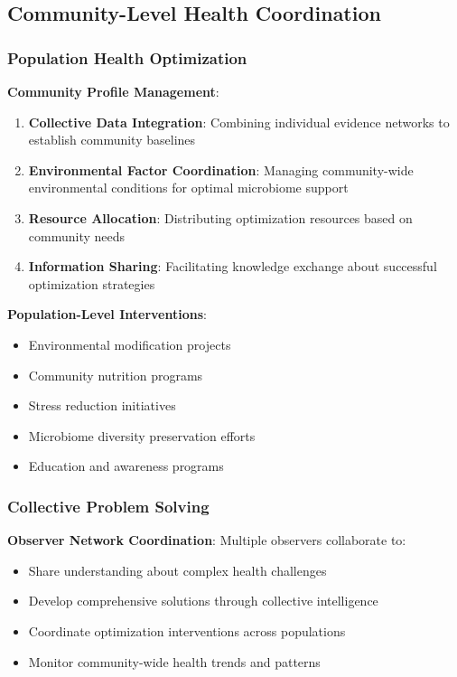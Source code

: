 \documentclass[12pt,a4paper]{article}
\begin{document}
\subsection{Community-Level Health Coordination}

\subsubsection{Population Health Optimization}

\textbf{Community Profile Management}:
\begin{enumerate}
\item \textbf{Collective Data Integration}: Combining individual evidence networks to establish community baselines
\item \textbf{Environmental Factor Coordination}: Managing community-wide environmental conditions for optimal microbiome support
\item \textbf{Resource Allocation}: Distributing optimization resources based on community needs
\item \textbf{Information Sharing}: Facilitating knowledge exchange about successful optimization strategies
\end{enumerate}

\textbf{Population-Level Interventions}:
\begin{itemize}
\item Environmental modification projects
\item Community nutrition programs
\item Stress reduction initiatives  
\item Microbiome diversity preservation efforts
\item Education and awareness programs
\end{itemize}

\subsubsection{Collective Problem Solving}

\textbf{Observer Network Coordination}:
Multiple observers collaborate to:
\begin{itemize}
\item Share understanding about complex health challenges
\item Develop comprehensive solutions through collective intelligence
\item Coordinate optimization interventions across populations
\item Monitor community-wide health trends and patterns
\end{itemize}
\end{document}
